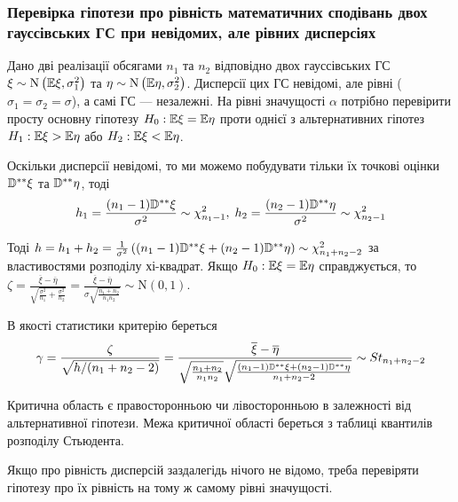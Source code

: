 \subsubsection*{Перевірка гіпотези про рівність математичних сподівань двох 
гауссівських ГС при невідомих, але рівних дисперсіях}

Дано дві реалізації обсягами $n_1$ та $n_2$ відповідно двох гауссівських ГС
$\xi \sim \mathrm{N}\left(\mathbb{E} \xi, \sigma_1^2\right)$ та $\eta \sim \mathrm{N}\left(\mathbb{E} \eta, \sigma_2^2\right)$.
Дисперсії цих ГС невідомі, але рівні ($\sigma_1 = \sigma_2 = \sigma$), а самі ГС --- незалежні. На рівні значущості $\alpha$ потрібно перевірити 
просту основну гіпотезу $H_0 : \mathbb{E} \xi = \mathbb{E} \eta$ проти однієї з альтернативних 
гіпотез $H_1 : \mathbb{E} \xi > \mathbb{E} \eta$ або $H_2 : \mathbb{E} \xi < \mathbb{E} \eta$.

Оскільки дисперсії невідомі, то ми можемо побудувати тільки їх точкові оцінки $\mathbb{D}^{**}\xi$ та
$\mathbb{D}^{**}\eta$, тоді
$$h_1 = \frac{(n_1 - 1)\mathbb{D}^{**}\xi}{\sigma^2} \sim \chi^2_{n_1 - 1}, \; h_2 = \frac{(n_2 - 1)\mathbb{D}^{**}\eta}{\sigma^2} \sim \chi^2_{n_2 - 1}$$

Тоді $h = h_1 + h_2 = \frac{1}{\sigma^2}\left((n_1-1)\mathbb{D}^{**}\xi + (n_2-1)\mathbb{D}^{**}\eta\right) \sim \chi_{n_1 + n_2 - 2}^2$ за властивостями розподілу хі-квадрат.
Якщо $H_0: \mathbb{E}\xi = \mathbb{E}\eta$ справджується, то 
$\zeta = \frac{\overline{\xi} - \overline{\eta}}{\sqrt{\frac{\sigma^2}{n_1} + \frac{\sigma^2}{n_2}}} =
\frac{\overline{\xi} - \overline{\eta}}{\sigma\sqrt{\frac{n_1 + n_2}{n_1 n_2}}} \sim \mathrm{N}(0, 1)$.

В якості статистики критерію береться
$$\gamma = \frac{\zeta}{\sqrt{h/(n_1 + n_2 - 2)}} = 
\frac{\overline{\xi} - \overline{\eta}}
{\sqrt{\frac{n_1 + n_2}{n_1 n_2}}
\sqrt{\frac{(n_1 - 1)\mathbb{D}^{**}\xi + (n_2 - 1)\mathbb{D}^{**}\eta}{n_1 + n_2 - 2}}} 
\sim {St}_{n_1 + n_2 - 2}$$

Критична область є правосторонньою чи лівосторонньою в залежності від альтернативної гіпотези.
Межа критичної області береться з таблиці квантилів розподілу Стьюдента. 
\begin{remark}
    Якщо про рівність дисперсій заздалегідь нічого не відомо, треба перевіряти гіпотезу про їх рівність
    на тому ж самому рівні значущості.
\end{remark}

